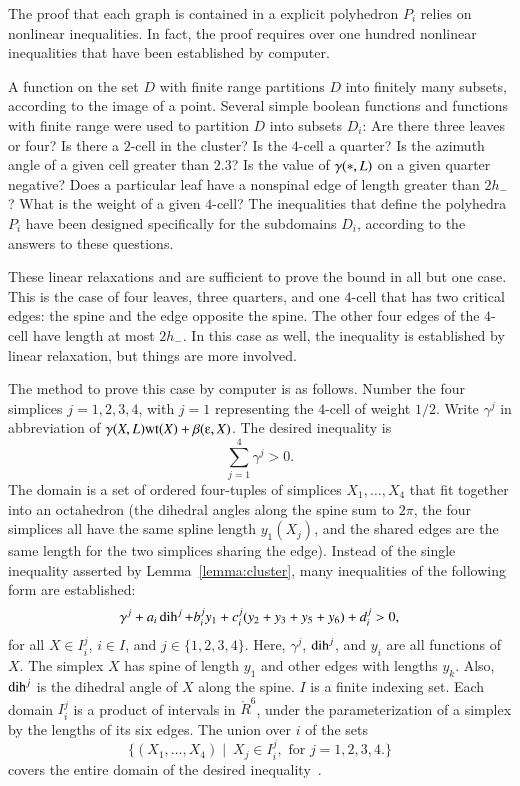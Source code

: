 The proof that each graph is contained in a explicit polyhedron $P_i$
relies on nonlinear inequalities.  In fact, the proof requires over
one hundred nonlinear inequalities that have been established by
computer.

A function on the set $D$ with finite range partitions $D$ into
finitely many subsets, according to the image of a point.  Several
simple boolean functions and functions with finite range were used to
partition $D$ into subsets $D_i$: Are there three leaves or four?  Is
there a $2$-cell in the cluster?  Is the $4$-cell a quarter?  Is the
azimuth angle of a given cell greater than $2.3$?  Is the value of
$\gamma({*},L)$ on a given quarter negative? Does a particular leaf have a
nonspinal edge of length greater than $2h_-$?  What is the weight of a
given $4$-cell?  The inequalities that define the polyhedra $P_i$ have
been designed specifically for the subdomains $D_i$, according to the
answers to these questions.

These linear relaxations and are sufficient to prove the bound in all
but one case.  This is the case of four leaves, three quarters, and
one $4$-cell that has two critical edges: the spine and the edge
opposite the spine.  The other four edges of the $4$-cell have length
at most $2h_-$.  In this case as well, the inequality is established
by linear relaxation, but things are more involved.

The method to prove this case by computer is as follows.  Number the
four simplices $j=1,2,3,4$, with $j=1$ representing the $4$-cell of
weight $1/2$.  Write $\gamma^j$ in abbreviation of
$\gamma(X,L)\op{wt}(X) + \beta(\ee,X)$.  The desired inequality is
\begin{equation}\label{eqn:gpos} 
\sum_{j=1}^4 \gamma^j > 0.
\end{equation}
The domain is a set of ordered four-tuples of simplices
$X_1,\ldots,X_4$ that fit together into an octahedron (the dihedral
angles along the spine sum to $2\pi$, the four simplices all have the
same spline length $y_1(X_j)$, and the shared edges are the same
length for the two simplices sharing the edge).  Instead of the single
inequality asserted by Lemma~\ref{lemma:cluster}, many inequalities of
the following form are established:
\begin{equation}\label{eqn:gpart} 
\gamma^j + a_i \operatorname{dih}^j + b_i^j y_1 + c_i^j (y_2+y_3+y_5+y_6) + d_i^j > 0, 
\end{equation}
for all $X \in I_i^j$, \quad $i \in I$, and $j\in \{1,2,3,4\}$.  Here,
$\gamma^j$, $\operatorname{dih}^j$, and $y_i$ are all functions of $X$.  The simplex
$X$ has spine of length $y_1$ and other edges with lengths $y_k$.
Also, $\operatorname{dih}^j$ is the dihedral angle of $X$ along the spine.  $I$ is a
finite indexing set.  Each domain $I_i^j$ is a product of intervals in
$\ring{R}^6$, under the parameterization of a simplex by the lengths
of its six edges.  The union over $i$ of the sets
\[  
\{(X_1,\ldots,X_4)\mid~ X_j \in I_i^j,\text{ for } j=1,2,3,4.\}
\] 
covers the entire domain of the desired inequality~.   

